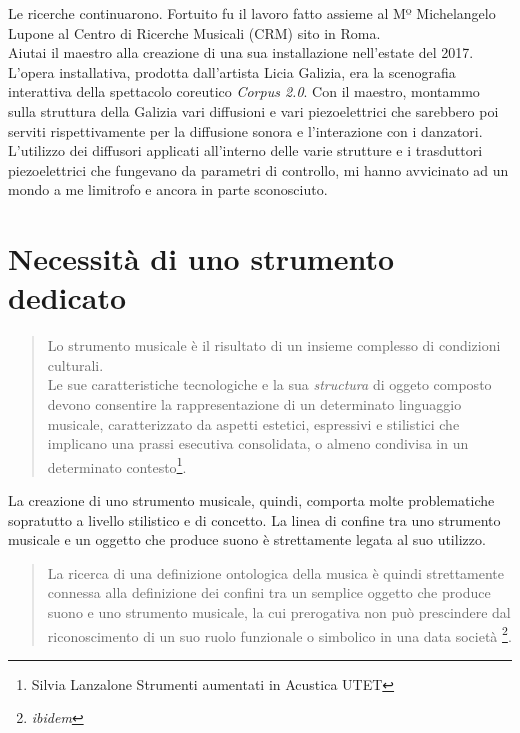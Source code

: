 Le ricerche continuarono. Fortuito fu il lavoro fatto assieme al Mº Michelangelo Lupone al Centro di Ricerche Musicali (CRM) sito in Roma. \\
Aiutai il maestro alla creazione di una sua installazione nell'estate del 2017. L'opera installativa, prodotta dall'artista Licia Galizia, era la scenografia interattiva della spettacolo coreutico \textit{Corpus 2.0}. Con il maestro, montammo sulla struttura della Galizia vari diffusioni e vari piezoelettrici che sarebbero poi serviti rispettivamente per la diffusione sonora e l'interazione con i danzatori. L'utilizzo dei diffusori applicati all'interno delle varie strutture e i trasduttori piezoelettrici che fungevano da parametri di controllo, mi hanno avvicinato ad un mondo a me limitrofo e ancora in parte sconosciuto. \\

\section{Necessità di uno strumento dedicato}
\begin{small}
\begin{quotation}
Lo strumento musicale è il risultato di un insieme complesso di condizioni culturali. \\
Le sue caratteristiche tecnologiche e la sua \textit{structura} di oggeto composto devono consentire la rappresentazione di un determinato linguaggio musicale, caratterizzato da aspetti estetici, espressivi e stilistici che implicano una prassi esecutiva consolidata, o almeno condivisa in un determinato contesto\footnote{Silvia Lanzalone Strumenti aumentati in Acustica UTET}.
\end{quotation}
\end{small}
La creazione di uno strumento musicale, quindi, comporta molte problematiche sopratutto a livello stilistico e di concetto. La linea di confine tra uno strumento musicale e un oggetto che produce suono è strettamente legata al suo utilizzo.
\begin{small}
\begin{quotation}
La ricerca di una definizione ontologica della musica è quindi strettamente connessa alla definizione dei confini tra un semplice oggetto che produce suono e uno strumento musicale, la cui prerogativa non può prescindere dal riconoscimento di un suo ruolo funzionale o simbolico in una data società
\footnote{\textit{ibidem}}.
\end{quotation}
\end{small}

